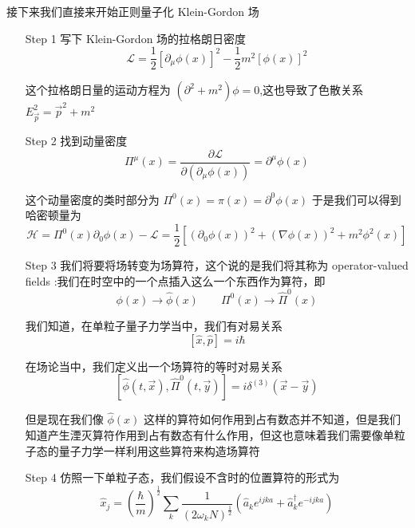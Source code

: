\documentclass{article}
\begin{document}
接下来我们直接来开始正则量子化 Klein-Gordon 场
\begin{itemize}
    \item[Step 1] 写下 Klein-Gordon 场的拉格朗日密度
    \begin{equation*}
        \mathcal{L} = \frac{1}{2}\left[\partial_\mu \phi(x)\right]^2 - \frac{1}{2}m^2\left[\phi (x)\right]^2
    \end{equation*}

    这个拉格朗日量的运动方程为 $\displaystyle \left(\partial^2 + m^2\right)\phi = 0$,这也导致了色散关系 $\displaystyle E_{\vec{p}}^2 = \vec{p}^2 + m^2$
    \item[Step 2] 找到动量密度
    \begin{equation*}
        \Pi^\mu(x) = \frac{\partial \mathcal{L}}{\partial\left(\partial_\mu \phi(x)\right)} = \partial^\mu \phi(x)
    \end{equation*}

    这个动量密度的类时部分为 $\displaystyle \Pi^0(x) = \pi(x) = \partial^0 \phi(x)$ 于是我们可以得到哈密顿量为
    \begin{equation*}
        \mathcal{H} = \Pi^0(x)\partial_0\phi (x) - \mathcal{L} = \frac{1}{2}\left[\left(\partial_0\phi(x)\right)^2 + \left(\nabla\phi(x)\right)^2 +m^2\phi^2(x)\right]
    \end{equation*}
    \item[Step 3] 我们将要将场转变为场算符，这个说的是我们将其称为 operator-valued fields :我们在时空中的一个点插入这么一个东西作为算符，即 
    \begin{equation*}
        \phi(x) \to \hat{\phi}(x)\quad\quad \Pi^0(x) \to \hat{\Pi}^0(x)
    \end{equation*}

    我们知道，在单粒子量子力学当中，我们有对易关系
    \begin{equation*}
        \left[\hat{x},\hat{p}\right] = i\hbar
    \end{equation*}

    在场论当中，我们定义出一个场算符的等时对易关系
    \begin{equation*}
        \left[\hat{\phi}(t,\vec{x}),\hat{\Pi}^0(t,\vec{y})\right] = i\delta^{(3)}(\vec{x} - \vec{y})
    \end{equation*}

    但是现在我们像 $\hat{\phi}(x)$ 这样的算符如何作用到占有数态并不知道，但是我们知道产生湮灭算符作用到占有数态有什么作用，但这也意味着我们需要像单粒子态的量子力学一样利用这些算符来构造场算符
    \item[Step 4] 仿照一下单粒子态，我们假设不含时的位置算符的形式为
    \begin{equation*}
        \hat{x}_j = \left(\frac{\hbar}{m}\right)^\frac{1}{2} \sum_k \frac{1}{\left(2\omega_k N\right)^\frac{1}{2}}\left(\hat{a}_k e^{ijka} + \hat{a}_k^\dagger e^{-ijka}\right)
    \end{equation*}


\end{itemize}
\end{document}

